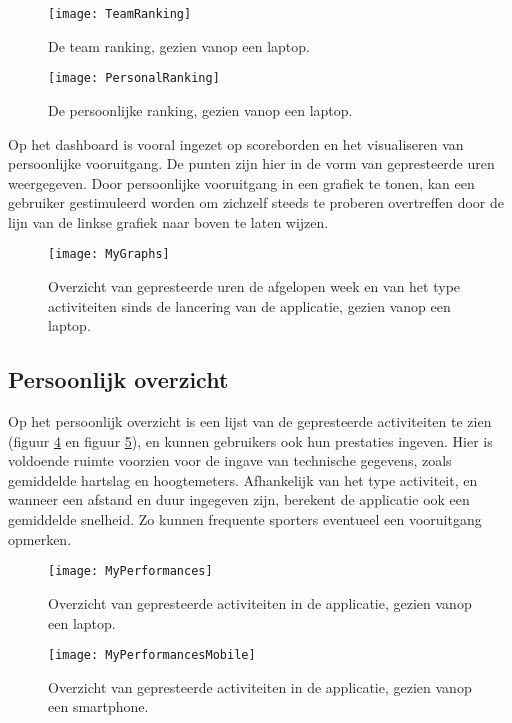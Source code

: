 \begin{figure}[h]
    \caption[Team ranking]{De team ranking, gezien vanop een laptop.}
    \texttt{[image: TeamRanking]}
    \label{fig:teamRanking}
\end{figure}

\begin{figure}[h]
    \caption[Persoonlijke ranking]{De persoonlijke ranking, gezien vanop een laptop.}
    \texttt{[image: PersonalRanking]}
    \label{fig:personalRanking}
\end{figure}

Op het dashboard is vooral ingezet op scoreborden en het visualiseren van persoonlijke vooruitgang. De punten zijn hier in de vorm van gepresteerde uren weergegeven. Door persoonlijke vooruitgang in een grafiek te tonen, kan een gebruiker gestimuleerd worden om zichzelf steeds te proberen overtreffen door de lijn van de linkse grafiek naar boven te laten wijzen.

\begin{figure}[h]
    \caption[Overzicht prestaties dashboard website]{Overzicht van gepresteerde uren de afgelopen week en van het type activiteiten sinds de lancering van de applicatie, gezien vanop een laptop.}
    \texttt{[image: MyGraphs]}
    \label{fig:graphs}
\end{figure}

\subsection{Persoonlijk overzicht}
Op het persoonlijk overzicht is een lijst van de gepresteerde activiteiten te zien (figuur \ref{fig:performances} en figuur \ref{fig:performancesMobile}), en kunnen gebruikers ook hun prestaties ingeven. Hier is voldoende ruimte voorzien voor de ingave van technische gegevens, zoals gemiddelde hartslag en hoogtemeters. Afhankelijk van het type activiteit, en wanneer een afstand en duur ingegeven zijn, berekent de applicatie ook een gemiddelde snelheid. Zo kunnen frequente sporters eventueel een vooruitgang opmerken.

\begin{figure}[h]
    \caption[Overzicht activiteiten website]{Overzicht van gepresteerde activiteiten in de applicatie, gezien vanop een laptop.}
    \texttt{[image: MyPerformances]}
    \label{fig:performances}
\end{figure}

\begin{figure}[h]
    \caption[Overzicht activiteiten website smartphone]{Overzicht van gepresteerde activiteiten in de applicatie, gezien vanop een smartphone.}
    \texttt{[image: MyPerformancesMobile]}
    \label{fig:performancesMobile}
\end{figure}

